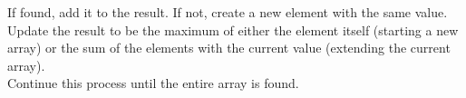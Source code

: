 \documentclass[preview]{standalone}
\begin{document}
If found, add it to the result. If not, create a new element with the same value.\\Update the result to be the maximum of either the element itself (starting a new array) or the sum of the elements with the current value (extending the current array).\\Continue this process until the entire array is found.\\
\end{document}

